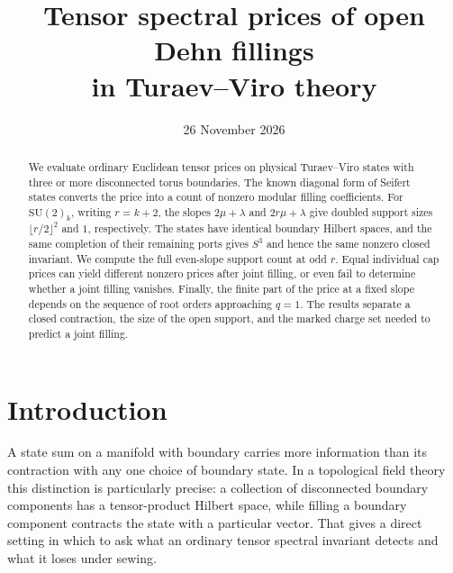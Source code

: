 \documentclass[11pt]{article}
\title{\textbf{Tensor spectral prices of open Dehn fillings\\ in Turaev--Viro theory}}
\author{}
\date{26 November 2026}
\theoremstyle{remark}
\begin{document}
\maketitle
\begin{abstract}
We evaluate ordinary Euclidean tensor prices on physical Turaev--Viro states with three or more disconnected torus boundaries. The known diagonal form of Seifert states converts the price into a count of nonzero modular filling coefficients. For \(\mathrm{SU}(2)_k\), writing \(r=k+2\), the slopes \(2\mu+\lambda\) and \(2r\mu+\lambda\) give doubled support sizes \(\lfloor r/2\rfloor^2\) and \(1\), respectively. The states have identical boundary Hilbert spaces, and the same completion of their remaining ports gives \(S^3\) and hence the same nonzero closed invariant. We compute the full even-slope support count at odd \(r\). Equal individual cap prices can yield different nonzero prices after joint filling, or even fail to determine whether a joint filling vanishes. Finally, the finite part of the price at a fixed slope depends on the sequence of root orders approaching \(q=1\). The results separate a closed contraction, the size of the open support, and the marked charge set needed to predict a joint filling.
\end{abstract}

\section{Introduction}

A state sum on a manifold with boundary carries more information than its contraction with any one choice of boundary state. In a topological field theory this distinction is particularly precise: a collection of disconnected boundary components has a tensor-product Hilbert space, while filling a boundary component contracts the state with a particular vector. That gives a direct setting in which to ask what an ordinary tensor spectral invariant detects and what it loses under sewing.
\end{document}
